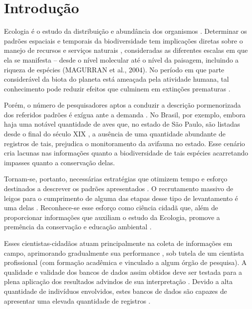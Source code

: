 \section{Introdução}

Ecologia é o estudo da distribuição e abundância dos organismos \cite{begon2009}. Determinar os padrões espaciais e temporais da biodiversidade tem implicações diretas sobre o manejo de recursos e serviços naturais \cite{groom2006,Roque2018}, consideradas as diferentes escalas em que ela se manifesta – desde o nível molecular até o nível da paisagem, incluindo a riqueza de espécies (MAGURRAN et al., 2004). No período em que parte considerável da biota do planeta está ameaçada pela atividade humana, tal conhecimento pode reduzir efeitos que culminem em extinções prematuras \cite{groom2006}.

Porém, o número de pesquisadores aptos a conduzir a descrição pormenorizada dos referidos padrões é exígua ante a demanda \cite{Amano2016,Greenwood2007}. No Brasil, por exemplo, embora haja uma notável quantidade de aves que, no estado de São Paulo, são listadas desde o final do século XIX \cite{Silveira2011}, a ausência de uma quantidade abundante de registros de tais, prejudica o monitoramento da avifauna no estado. Esse cenário cria lacunas nas informações quanto a biodiversidade de tais espécies \cite{Amano2016} acarretando impasses quanto a conservação delas. 
	

Tornam-se, portanto, necessárias estratégias que otimizem tempo e esforço destinados a descrever os padrões apresentados \cite{Amano2016,Greenwood2007}. O recrutamento massivo de leigos para o cumprimento de alguma das etapas desse tipo de levantamento é uma delas \cite{Lepczyk2005,Phillips2014,Tredick2017,Horns2018}. Reconhece-se esse esforço como ciência cidadã \cite{Kullenberg2016} que, além de proporcionar informações que auxiliam o estudo da Ecologia, promove a premência da conservação e educação ambiental \cite{DiasdaSilva2019,Bonney2016}.


Esses cientistas-cidadãos atuam principalmente na coleta de informações em campo, aprimorando gradualmente sua performance \cite{Phillips2014,Kieslinger2019}, sob tutela de um cientista profissional (com formação acadêmica e vinculado a algum órgão de pesquisa). A qualidade e validade dos bancos de dados assim obtidos deve ser testada para a plena aplicação dos resultados advindos de sua interpretação \cite{Phillips2014,Tredick2017,Kieslinger2019}. Devido a alta quantidade de indivíduos envolvidos, estes bancos de dados são capazes de apresentar uma elevada quantidade de registros \cite{Alexandrino2018}.


